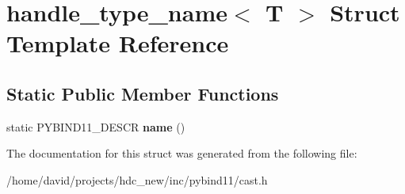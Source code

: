 \hypertarget{structhandle__type__name}{}\section{handle\+\_\+type\+\_\+name$<$ T $>$ Struct Template Reference}
\label{structhandle__type__name}
\subsection*{Static Public Member Functions}
\begin{DoxyCompactItemize}
\item 
static P\+Y\+B\+I\+N\+D11\+\_\+\+D\+E\+S\+CR {\bfseries name} ()\hypertarget{structhandle__type__name_acfab3d83e5b9ad2430900922a168f0bd}{}\label{structhandle__type__name_acfab3d83e5b9ad2430900922a168f0bd}

\end{DoxyCompactItemize}


The documentation for this struct was generated from the following file\+:\begin{DoxyCompactItemize}
\item 
/home/david/projects/hdc\+\_\+new/inc/pybind11/cast.\+h\end{DoxyCompactItemize}
